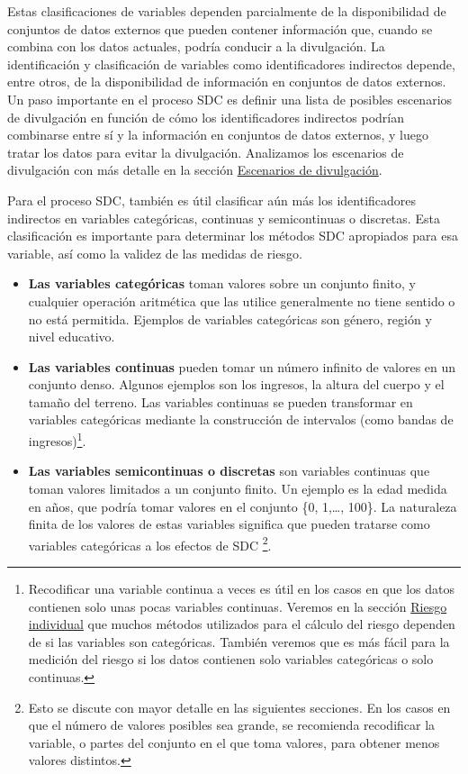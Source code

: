 \documentclass[
]{book}
\theoremstyle{definition}
\theoremstyle{definition}
\theoremstyle{definition}
\theoremstyle{definition}
\theoremstyle{remark}
\begin{document}
Estas clasificaciones de variables dependen parcialmente de la disponibilidad de conjuntos de datos externos que pueden contener información que, cuando se combina con los datos actuales, podría conducir a la divulgación. La identificación y clasificación de variables como identificadores indirectos depende, entre otros, de la disponibilidad de información en conjuntos de datos externos. Un paso importante en el proceso SDC es definir una lista de posibles escenarios de divulgación en función de cómo los identificadores indirectos podrían combinarse entre sí y la información en conjuntos de datos externos, y luego tratar los datos para evitar la divulgación. Analizamos los escenarios de divulgación con más detalle en la sección \protect\hyperlink{escenarios-de-divulgaciuxf3n}{Escenarios de divulgación}.

Para el proceso SDC, también es útil clasificar aún más los identificadores indirectos en variables categóricas, continuas y semicontinuas o discretas. Esta clasificación es importante para determinar los métodos SDC apropiados para esa variable, así como la validez de las medidas de riesgo.

\begin{itemize}
\item
  \textbf{Las variables categóricas} toman valores sobre un conjunto finito, y cualquier operación aritmética que las utilice generalmente no tiene sentido o no está permitida. Ejemplos de variables categóricas son género, región y nivel educativo.
\item
  \textbf{Las variables continuas} pueden tomar un número infinito de valores en un conjunto denso. Algunos ejemplos son los ingresos, la altura del cuerpo y el tamaño del terreno. Las variables continuas se pueden transformar en variables categóricas mediante la construcción de intervalos (como bandas de ingresos)\footnote{Recodificar una variable continua a veces es útil en los casos en que los datos contienen solo unas pocas variables continuas. Veremos en la sección \protect\hyperlink{riesgo-individual}{Riesgo individual} que muchos métodos utilizados para el cálculo del riesgo dependen de si las variables son categóricas. También veremos que es más fácil para la medición del riesgo si los datos contienen solo variables categóricas o solo continuas.}.
\item
  \textbf{Las variables semicontinuas o discretas} son variables continuas que toman valores limitados a un conjunto finito. Un ejemplo es la edad medida en años, que podría tomar valores en el conjunto \{0, 1,\ldots, 100\}. La naturaleza finita de los valores de estas variables significa que pueden tratarse como variables categóricas a los efectos de SDC \footnote{Esto se discute con mayor detalle en las siguientes secciones. En los casos en que el número de valores posibles sea grande, se recomienda recodificar la variable, o partes del conjunto en el que toma valores, para obtener menos valores distintos.}.
\end{itemize}
\end{document}
